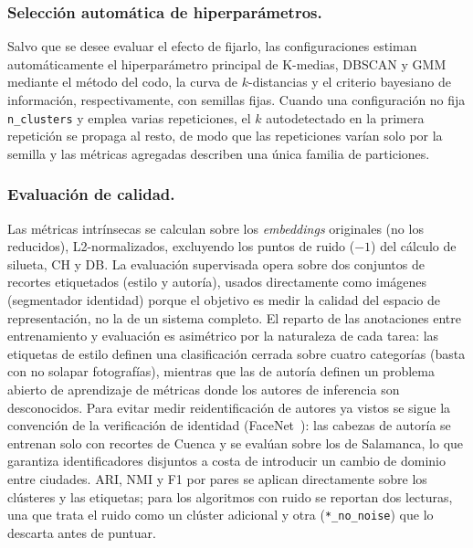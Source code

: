\subsubsection{Selección automática de hiperparámetros.}
\label{subsubsec:hiperparam-auto}
Salvo que se desee evaluar el efecto de fijarlo, las configuraciones estiman
automáticamente el hiperparámetro principal de K-medias, DBSCAN y GMM mediante el
método del codo, la curva de $k$-distancias y el criterio bayesiano de
información, respectivamente, con semillas fijas. Cuando una configuración no
fija \texttt{n\_clusters} y emplea varias repeticiones, el $k$ autodetectado en
la primera repetición se propaga al resto, de modo que las repeticiones varían
solo por la semilla y las métricas agregadas describen una única familia de
particiones.

\subsubsection{Evaluación de calidad.}
\label{subsubsec:eval-extrinseca}
Las métricas intrínsecas se calculan sobre los \textit{embeddings} originales (no
los reducidos), L2-normalizados, excluyendo los puntos de ruido ($-1$) del
cálculo de silueta, CH y DB. La evaluación supervisada opera sobre dos conjuntos
de recortes etiquetados (estilo y autoría), usados directamente como imágenes
(segmentador identidad) porque el objetivo es medir la calidad del espacio de
representación, no la de un sistema completo. El reparto de las anotaciones entre
entrenamiento y evaluación es asimétrico por la naturaleza de cada tarea: las
etiquetas de estilo definen una clasificación cerrada sobre cuatro categorías
(basta con no solapar fotografías), mientras que las de autoría definen un
problema abierto de aprendizaje de métricas donde los autores de inferencia son
desconocidos. Para evitar medir reidentificación de autores ya vistos se sigue la
convención de la verificación de identidad
(FaceNet~\cite{schroff_facenet_2015}): las cabezas de autoría se entrenan solo
con recortes de Cuenca y se evalúan sobre los de Salamanca, lo que garantiza
identificadores disjuntos a costa de introducir un cambio de dominio entre
ciudades. ARI, NMI y F1 por pares se aplican directamente sobre los clústeres y
las etiquetas; para los algoritmos con ruido se reportan dos lecturas, una que
trata el ruido como un clúster adicional y otra (\texttt{*\_no\_noise}) que lo
descarta antes de puntuar.

